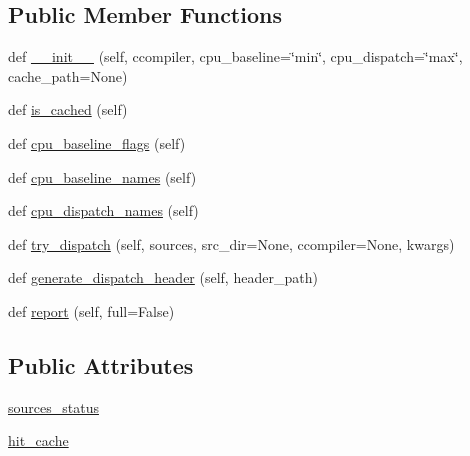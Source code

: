 \subsection*{Public Member Functions}
\begin{DoxyCompactItemize}
\item 
def \hyperlink{classnumpy_1_1distutils_1_1ccompiler__opt_1_1CCompilerOpt_af80880f79723288604c639e3e3cb003c}{\+\_\+\+\_\+init\+\_\+\+\_\+} (self, ccompiler, cpu\+\_\+baseline=\char`\"{}min\char`\"{}, cpu\+\_\+dispatch=\char`\"{}max\char`\"{}, cache\+\_\+path=None)
\item 
def \hyperlink{classnumpy_1_1distutils_1_1ccompiler__opt_1_1CCompilerOpt_a54b4221a3165558c369244e6d34c7885}{is\+\_\+cached} (self)
\item 
def \hyperlink{classnumpy_1_1distutils_1_1ccompiler__opt_1_1CCompilerOpt_aa95d87a496f80898a86585b05363539f}{cpu\+\_\+baseline\+\_\+flags} (self)
\item 
def \hyperlink{classnumpy_1_1distutils_1_1ccompiler__opt_1_1CCompilerOpt_a939f841310e2dfffa90affbb5bdfd374}{cpu\+\_\+baseline\+\_\+names} (self)
\item 
def \hyperlink{classnumpy_1_1distutils_1_1ccompiler__opt_1_1CCompilerOpt_a0837c49c785377fcf06ab40447160ab6}{cpu\+\_\+dispatch\+\_\+names} (self)
\item 
def \hyperlink{classnumpy_1_1distutils_1_1ccompiler__opt_1_1CCompilerOpt_aa5750b8d716f6c2edc1f2020d17be51b}{try\+\_\+dispatch} (self, sources, src\+\_\+dir=None, ccompiler=None, kwargs)
\item 
def \hyperlink{classnumpy_1_1distutils_1_1ccompiler__opt_1_1CCompilerOpt_a70d5e06f0d641e5e33890bb95901920f}{generate\+\_\+dispatch\+\_\+header} (self, header\+\_\+path)
\item 
def \hyperlink{classnumpy_1_1distutils_1_1ccompiler__opt_1_1CCompilerOpt_a4c2f78b5e6b5ddcc1d5abb5f7fc851e9}{report} (self, full=False)
\end{DoxyCompactItemize}
\subsection*{Public Attributes}
\begin{DoxyCompactItemize}
\item 
\hyperlink{classnumpy_1_1distutils_1_1ccompiler__opt_1_1CCompilerOpt_a5f51fa3677a680989f1565e1622fb9b1}{sources\+\_\+status}
\item 
\hyperlink{classnumpy_1_1distutils_1_1ccompiler__opt_1_1CCompilerOpt_ad692c5743b8c9d9eb06cb0d5d6f6aae6}{hit\+\_\+cache}
\end{DoxyCompactItemize}
